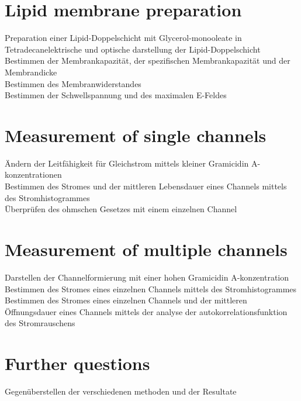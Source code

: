 \documentclass{include/thesisclass3}
\begin{document}
\section{Lipid membrane preparation}

Preparation einer Lipid-Doppelschicht mit Glycerol-monooleate in Tetradecanelektrische und optische darstellung der Lipid-Doppelschicht\\

Bestimmen der Membrankapazität, der spezifischen Membrankapazität und der Membrandicke\\ 

Bestimmen des Membranwiderstandes\\ 

Bestimmen der Schwellspannung und des maximalen E-Feldes

\section{Measurement of single channels}
Ändern der Leitfähigkeit für Gleichstrom mittels kleiner Gramicidin A-konzentrationen\\

Bestimmen des Stromes und der mittleren Lebensdauer eines Channels mittels des Stromhistogrammes\\

Überprüfen des ohmschen Gesetzes mit einem einzelnen Channel\\

\section{Measurement of multiple channels}

Darstellen der Channelformierung mit einer hohen Gramicidin A-konzentration\\

Bestimmen des Stromes eines einzelnen Channels mittels des Stromhistogrammes\\

Bestimmen des Stromes eines einzelnen Channels und der mittleren Öffnungsdauer eines Channels mittels der analyse der autokorrelationsfunktion des Stromrauschens

\section{Further questions}

Gegenüberstellen der verschiedenen methoden und der Resultate\\
\end{document}
